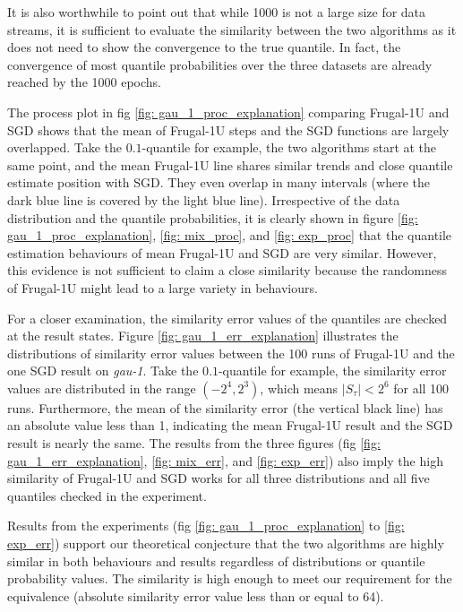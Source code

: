 It is also worthwhile to point out that while 1000 is not a large size for data streams, it is sufficient to evaluate the similarity between the two algorithms as it does not need to show the convergence to the true quantile. In fact, the convergence of most quantile probabilities over the three datasets are already reached by the 1000 epochs.

The process plot in fig \ref{fig: gau_1_proc_explanation} comparing Frugal-1U and SGD shows that the mean of Frugal-1U steps and the SGD functions are largely overlapped. Take the $0.1$-quantile for example, the two algorithms start at the same point, and the mean Frugal-1U line shares similar trends and close quantile estimate position with SGD. They even overlap in many intervals (where the dark blue line is covered by the light blue line).
Irrespective of the data distribution and the quantile probabilities, it is clearly shown in figure \ref{fig: gau_1_proc_explanation}, \ref{fig: mix_proc}, and \ref{fig: exp_proc} that the quantile estimation behaviours of mean Frugal-1U and SGD are very similar. However, this evidence is not sufficient to claim a close similarity because the randomness of Frugal-1U might lead to a large variety in behaviours.

For a closer examination, the similarity error values of the quantiles are checked at the result states. Figure \ref{fig: gau_1_err_explanation} illustrates the distributions of similarity error values between the 100 runs of Frugal-1U and the one SGD result on \textit{gau-1}. Take the $0.1$-quantile for example, the similarity error values are distributed in the range $(-2^4, 2^3)$, which means $|S_\tau| < 2^6$ for all 100 runs. Furthermore, the mean of the similarity error (the vertical black line) has an absolute value less than 1, indicating the mean Frugal-1U result and the SGD result is nearly the same. The results from the three figures (fig \ref{fig: gau_1_err_explanation}, \ref{fig: mix_err}, and \ref{fig: exp_err}) also imply the high similarity of Frugal-1U and SGD works for all three distributions and all five quantiles checked in the experiment.

Results from the experiments (fig \ref{fig: gau_1_proc_explanation} to \ref{fig: exp_err}) support our theoretical conjecture that the two algorithms are highly similar in both behaviours and results regardless of distributions or quantile probability values. The similarity is high enough to meet our requirement for the equivalence (absolute similarity error value less than or equal to 64).

